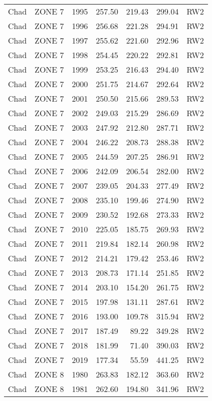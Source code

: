 \begin{longtable}{lllrrrl}
  Chad & ZONE 7 & 1995 & 257.50 & 219.43 & 299.04 & RW2 \\ 
  Chad & ZONE 7 & 1996 & 256.68 & 221.28 & 294.91 & RW2 \\ 
  Chad & ZONE 7 & 1997 & 255.62 & 221.60 & 292.96 & RW2 \\ 
  Chad & ZONE 7 & 1998 & 254.45 & 220.22 & 292.81 & RW2 \\ 
  Chad & ZONE 7 & 1999 & 253.25 & 216.43 & 294.40 & RW2 \\ 
  Chad & ZONE 7 & 2000 & 251.75 & 214.67 & 292.64 & RW2 \\ 
  Chad & ZONE 7 & 2001 & 250.50 & 215.66 & 289.53 & RW2 \\ 
  Chad & ZONE 7 & 2002 & 249.03 & 215.29 & 286.69 & RW2 \\ 
  Chad & ZONE 7 & 2003 & 247.92 & 212.80 & 287.71 & RW2 \\ 
  Chad & ZONE 7 & 2004 & 246.22 & 208.73 & 288.38 & RW2 \\ 
  Chad & ZONE 7 & 2005 & 244.59 & 207.25 & 286.91 & RW2 \\ 
  Chad & ZONE 7 & 2006 & 242.09 & 206.54 & 282.00 & RW2 \\ 
  Chad & ZONE 7 & 2007 & 239.05 & 204.33 & 277.49 & RW2 \\ 
  Chad & ZONE 7 & 2008 & 235.10 & 199.46 & 274.90 & RW2 \\ 
  Chad & ZONE 7 & 2009 & 230.52 & 192.68 & 273.33 & RW2 \\ 
  Chad & ZONE 7 & 2010 & 225.05 & 185.75 & 269.93 & RW2 \\ 
  Chad & ZONE 7 & 2011 & 219.84 & 182.14 & 260.98 & RW2 \\ 
  Chad & ZONE 7 & 2012 & 214.21 & 179.42 & 253.46 & RW2 \\ 
  Chad & ZONE 7 & 2013 & 208.73 & 171.14 & 251.85 & RW2 \\ 
  Chad & ZONE 7 & 2014 & 203.10 & 154.20 & 261.75 & RW2 \\ 
  Chad & ZONE 7 & 2015 & 197.98 & 131.11 & 287.61 & RW2 \\ 
  Chad & ZONE 7 & 2016 & 193.00 & 109.78 & 315.94 & RW2 \\ 
  Chad & ZONE 7 & 2017 & 187.49 & 89.22 & 349.28 & RW2 \\ 
  Chad & ZONE 7 & 2018 & 181.99 & 71.40 & 390.03 & RW2 \\ 
  Chad & ZONE 7 & 2019 & 177.34 & 55.59 & 441.25 & RW2 \\ 
  Chad & ZONE 8 & 1980 & 263.83 & 182.12 & 363.60 & RW2 \\ 
  Chad & ZONE 8 & 1981 & 262.60 & 194.80 & 341.96 & RW2 \\ 

\end{longtable}
